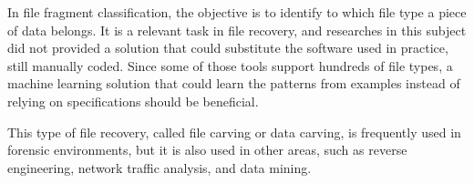 In file fragment classification, the objective is to identify to which file type a piece of data belongs. It is a relevant task in file recovery, and researches in this subject did not provided a solution that could substitute the software used in practice, still manually coded. Since some of those tools support hundreds of file types, a machine learning solution that could learn the patterns from examples instead of relying on specifications should be beneficial.






This type of file recovery, called file carving or data carving, is frequently used in forensic environments, but it is also used in other areas, such as reverse engineering, network traffic analysis, and data mining.

